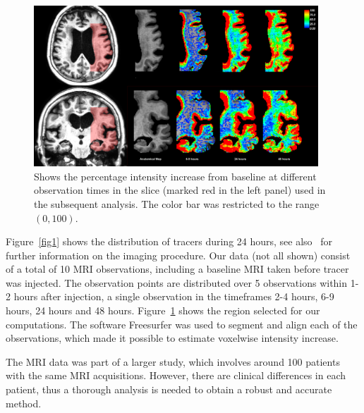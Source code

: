 \documentclass[11pt,a4paper]{article}
\begin{document}
\begin{figure}
\includegraphics[width=0.95\textwidth]{Zoom-PatID-68.png} 
\caption{Shows the percentage intensity increase from baseline at different observation times in the slice (marked red in the left panel) used in the subsequent analysis. The color bar was restricted to the range $(0,100)$. }
\label{fig2} 
\end{figure}
Figure~\ref{fig1} shows the distribution of tracers during 24 hours, see also~\cite{ringstad2018brain} for further information on the imaging procedure.   
Our data (not all shown) consist of a total of 10 MRI observations, including a baseline MRI taken before tracer was injected. The observation points are distributed over 5 observations within 1-2 hours after injection, a single observation in the timeframes 2-4 hours, 6-9 hours, 24 hours and 48 hours. 
Figure~\ref{fig2} shows the region selected for our computations. 
The software Freesurfer \cite{Dale1999179, FischlLiuDale, spf2007, reuter:robreg10} was used to segment and align each of the observations, which made it possible to estimate voxelwise intensity increase. 

The MRI data was part of a larger study, which involves around 100 patients with the same MRI acquisitions. However, there are clinical differences in each patient, thus a thorough analysis is needed to obtain a robust and accurate method.
\end{document}
